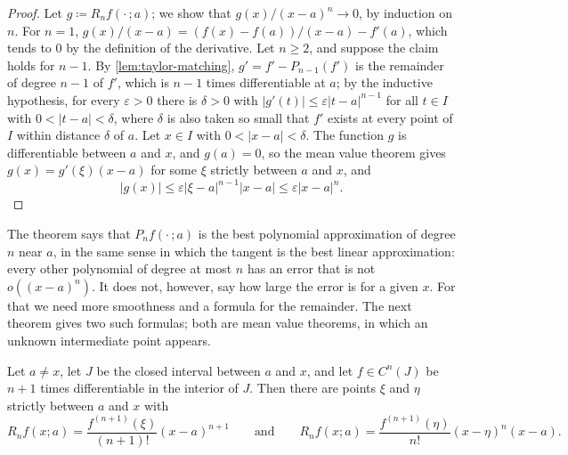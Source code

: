 \begin{proof}
Let $g\coloneqq R_nf(\cdot\,;a)$; we show that $g(x)/(x-a)^n\to0$, by induction on $n$. For $n=1$, $g(x)/(x-a)=(f(x)-f(a))/(x-a)-f'(a)$, which tends to $0$ by the definition of the derivative. Let $n\ge2$, and suppose the claim holds for $n-1$. By \cref{lem:taylor-matching}, $g'=f'-P_{n-1}(f')$ is the remainder of degree $n-1$ of $f'$, which is $n-1$ times differentiable at $a$; by the inductive hypothesis, for every $\varepsilon>0$ there is $\delta>0$ with $|g'(t)|\le\varepsilon|t-a|^{n-1}$ for all $t\in I$ with $0<|t-a|<\delta$, where $\delta$ is also taken so small that $f'$ exists at every point of $I$ within distance $\delta$ of $a$. Let $x\in I$ with $0<|x-a|<\delta$. The function $g$ is differentiable between $a$ and $x$, and $g(a)=0$, so the mean value theorem gives $g(x)=g'(\xi)(x-a)$ for some $\xi$ strictly between $a$ and $x$, and
\[
|g(x)|\le\varepsilon|\xi-a|^{n-1}|x-a|\le\varepsilon|x-a|^n .
\]
\end{proof}

The theorem says that $P_nf(\cdot\,;a)$ is the best polynomial approximation of degree $n$ near $a$, in the same sense in which the tangent is the best linear approximation: every other polynomial of degree at most $n$ has an error that is not $o((x-a)^n)$. It does not, however, say how large the error is for a given $x$. For that we need more smoothness and a formula for the remainder. The next theorem gives two such formulas; both are mean value theorems, in which an unknown intermediate point appears.

\begin{theorem}
\label{thm:taylor-lagrange}
Let $a\ne x$, let $J$ be the closed interval between $a$ and $x$, and let $f\in C^n(J)$ be $n+1$ times differentiable in the interior of $J$. Then there are points $\xi$ and $\eta$ strictly between $a$ and $x$ with
\[
R_nf(x;a)=\frac{f^{(n+1)}(\xi)}{(n+1)!}(x-a)^{n+1}\qquad\text{and}\qquad R_nf(x;a)=\frac{f^{(n+1)}(\eta)}{n!}(x-\eta)^n(x-a).
\]
\end{theorem}

